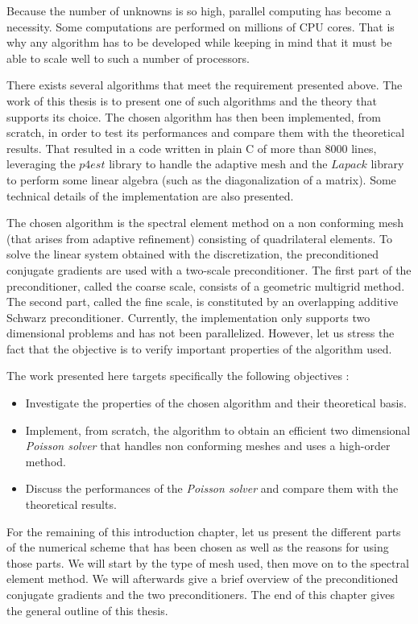 Because the number of unknowns is so high, parallel computing has become a necessity. Some computations are performed on millions of CPU cores. That is why any algorithm has to be developed while keeping in mind that it must be able to scale well to such a number of processors. 

There exists several algorithms that meet the requirement presented above. The work of this thesis is to present one of such algorithms and the theory that supports its choice. The chosen algorithm has then been implemented, from scratch, in order to test its performances and compare them with the theoretical results. That resulted in a code written in plain C of more than 8000 lines, leveraging the $p4est$ library to handle the adaptive mesh and the $Lapack$ library to perform some linear algebra (such as the diagonalization of a matrix). Some technical details of the implementation are also presented. 

The chosen algorithm is the spectral element method on a non conforming mesh (that arises from adaptive refinement) consisting of quadrilateral elements. To solve the linear system obtained with the discretization, the preconditioned conjugate gradients are used with a two-scale preconditioner. The first part of the preconditioner, called the coarse scale, consists of a geometric multigrid method. The second part, called the fine scale, is constituted by an overlapping additive Schwarz preconditioner. Currently, the implementation only supports two dimensional problems and has not been parallelized. However, let us stress the fact that the objective is to verify important properties of the algorithm used.

The work presented here targets specifically the following objectives : 
\begin{itemize}
\item Investigate the properties of the chosen algorithm and their theoretical basis.
\item Implement, from scratch, the algorithm to obtain an efficient two dimensional \textit{Poisson solver} that handles non conforming meshes and uses a high-order method.
\item Discuss the performances of the \textit{Poisson solver} and compare them with the theoretical results. 
\end{itemize}


For the remaining of this introduction chapter, let us present the different parts of the numerical scheme that has been chosen as well as the reasons for using those parts. We will start by the type of mesh used, then move on to the spectral element method. We will afterwards give a brief overview of the preconditioned conjugate gradients and the two preconditioners. The end of this chapter gives the general outline of this thesis. 



